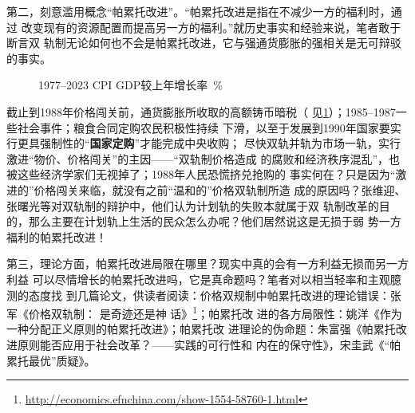 第二，刻意滥用概念“帕累托改进”。“帕累托改进是指在不减少一方的福利时，通过
改变现有的资源配置而提高另一方的福利。”就历史事实和经验来说，笔者敢于断言双
轨制无论如何也不会是帕累托改进，它与强通货膨胀的强相关是无可辩驳
的事实。

\begin{figure}[ht]
  \centering


  \caption{\label{fig:tongpeng30}1977--2023 CPI GDP较上年增长率\ \% }
\end{figure}

截止到1988年价格闯关前，通货膨胀所收取的高额铸币暗税（
见\cref{fig:tongpeng30}）；1985--1987一些社会事件；粮食合同定购农民积极性持续
下滑，以至于发展到1990年国家要实行更具强制性的“\textbf{国家定购}”才能完成中央收购；
尽快双轨并轨为市场一轨，实行激进“物价、价格闯关”的主因——“双轨制价格造成
的腐败和经济秩序混乱”，也被这些经济学家们无视掉了；1988年人民恐慌挤兑抢购的
事实何在？只是因为“激进的”价格闯关来临，就没有之前“温和的”价格双轨制所造
成的原因吗？张维迎、张曙光等对双轨制的辩护中，他们认为计划轨的失败本就属于双
轨制改革的目的，那么主要在计划轨上生活的民众怎么办呢？他们居然说这是无损于弱
势一方福利的帕累托改进！

第三，理论方面，帕累托改进局限在哪里？现实中真的会有一方利益无损而另一方利益
可以尽情增长的帕累托改进吗，它是真命题吗？笔者对以相当轻率和主观臆测的态度找
到几篇论文，供读者阅读：价格双规制中帕累托改进的理论错误：张军《价格双轨制：
是奇迹还是神
话》\footnote{\url{http://economics.efnchina.com/show-1554-58760-1.html}}；帕累托改
进的各方局限性：姚洋《作为一种分配正义原则的帕累托改进》\cite{yaoyang}；帕累托改
进理论的伪命题：朱富强《帕累托改进原则能否应用于社会改革？——实践的可行性和
内在的保守性》\cite{zhufuqiang}，宋圭武《“帕累托最优”质疑》\cite{songguiwu}。

